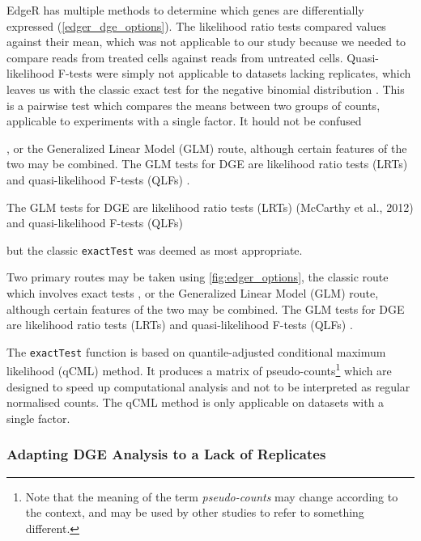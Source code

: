 EdgeR has multiple methods to determine which genes are differentially expressed (\autoref{edger_dge_options}). The likelihood ratio tests \citep{mccarthy2012differential} compared values against their mean, which was not applicable to our study because we needed to compare reads from treated cells against reads from untreated cells. Quasi-likelihood F-tests \citep{lun2016s, lund2012detecting} were simply not applicable to datasets lacking replicates, which leaves us with the classic exact test for the negative binomial distribution \citep{robinson2007moderated, robinson2008small}. This is a pairwise test which compares the means between two groups of counts, applicable to experiments with a single factor. It hould not be confused

\citep{robinson2007moderated, robinson2008small}, or the Generalized Linear Model (GLM) route, although certain features of the two may be combined. The GLM tests for \ac{DGE} are likelihood ratio tests (LRTs)  and quasi-likelihood F-tests (QLFs) \citep{lun2016s, lund2012detecting}.

The GLM tests for DGE are likelihood ratio tests (LRTs) (McCarthy et al.,
2012) and quasi-likelihood F-tests (QLFs) 

 but the classic \texttt{exactTest} was deemed as most appropriate. 

 Two primary routes may be taken using \autoref{fig:edger_options}, the classic route which involves exact tests \citep{robinson2007moderated, robinson2008small}, or the Generalized Linear Model (GLM) route, although certain features of the two may be combined. The GLM tests for \ac{DGE} are likelihood ratio tests (LRTs) \citep{mccarthy2012differential} and quasi-likelihood F-tests (QLFs) \citep{lun2016s, lund2012detecting}.

The \texttt{exactTest} function is based on quantile-adjusted conditional maximum likelihood (qCML) method. It produces a matrix of pseudo-counts\footnote{Note that the meaning of the term \textit{pseudo-counts} may change according to the context, and may be used by other studies to refer to something different.} which are designed to speed up computational analysis and not to be interpreted as regular normalised counts. The qCML method is only applicable on datasets with a single factor.


\subsubsection{Adapting DGE Analysis to a Lack of Replicates}
\label{DGE no replicates}

